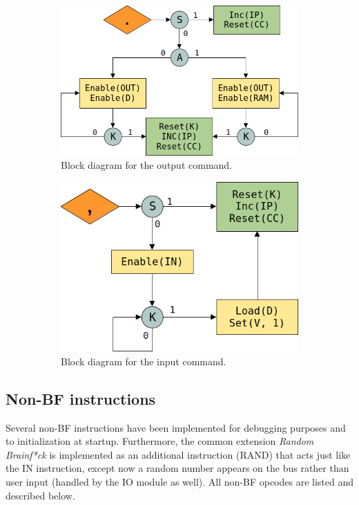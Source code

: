 \begin{figure}[H]
  \centering
  \mbox{}\hfill
  \begin{subfigure}[t]{0.4\linewidth}
    \centering
    \includegraphics[scale=0.3]{img/outputalg}
    \caption{Block diagram for the output command.}
    \label{fig:inputbufalg}
  \end{subfigure}
  \hfill
  \begin{subfigure}[t]{0.4\linewidth}
    \centering
    \includegraphics[scale=0.3]{img/inputalg}
    \caption{Block diagram for the input command.}
    \label{fig:inputimalg}
  \end{subfigure}
  \hfill\mbox{}
  \caption{}
  \label{fig:inputalg}
\end{figure}

\subsection{Non-BF instructions} \label{seq:sequences:nonbf}
Several non-BF instructions have been implemented for debugging purposes and to initialization at startup. Furthermore, the common extension \emph{Random Brainf*ck} \cite{esolangs-rbf} is implemented as an additional instruction (RAND) that acts just like the IN instruction, except now a random number appears on the bus rather than user input (handled by the IO module as well). All non-BF opcodes are listed and described below.


